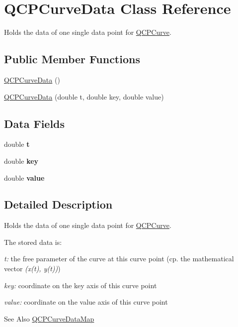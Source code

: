 \hypertarget{classQCPCurveData}{\section{Q\-C\-P\-Curve\-Data Class Reference}
\label{classQCPCurveData}
}


Holds the data of one single data point for \hyperlink{classQCPCurve}{Q\-C\-P\-Curve}.  


\subsection*{Public Member Functions}
\begin{DoxyCompactItemize}
\item 
\hyperlink{classQCPCurveData_a48252779b5198a509d99c69ae223fbf8}{Q\-C\-P\-Curve\-Data} ()
\item 
\hyperlink{classQCPCurveData_a3586be0cc6f8db15bcdd0c0d03b0c173}{Q\-C\-P\-Curve\-Data} (double t, double key, double value)
\end{DoxyCompactItemize}
\subsection*{Data Fields}
\begin{DoxyCompactItemize}
\item 
\hypertarget{classQCPCurveData_aecc395525be28e9178a088793beb3ff3}{double {\bfseries t}}\label{classQCPCurveData_aecc395525be28e9178a088793beb3ff3}

\item 
\hypertarget{classQCPCurveData_a8a4ec5f2b9a396149fd842e309701bd4}{double {\bfseries key}}\label{classQCPCurveData_a8a4ec5f2b9a396149fd842e309701bd4}

\item 
\hypertarget{classQCPCurveData_a72b39b8e1dbf7b45382ebd48419b6828}{double {\bfseries value}}\label{classQCPCurveData_a72b39b8e1dbf7b45382ebd48419b6828}

\end{DoxyCompactItemize}


\subsection{Detailed Description}
Holds the data of one single data point for \hyperlink{classQCPCurve}{Q\-C\-P\-Curve}. 

The stored data is\-: \begin{DoxyItemize}
\item {\itshape t\-:} the free parameter of the curve at this curve point (cp. the mathematical vector {\itshape (x(t), y(t))}) \item {\itshape key\-:} coordinate on the key axis of this curve point \item {\itshape value\-:} coordinate on the value axis of this curve point\end{DoxyItemize}
\begin{DoxySeeAlso}{See Also}
\hyperlink{qcustomplot_8h_a444d37ec9cb2951b3a7fe443c34d1658}{Q\-C\-P\-Curve\-Data\-Map} 
\end{DoxySeeAlso}


